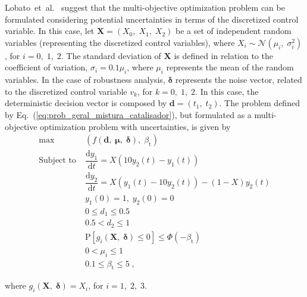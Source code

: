 \documentclass[final,5p,times,twocolumn,numbers]{elsarticle}
\newcommand{\vect}[1]{\mathbf{\boldsymbol{#1}}}
\begin{document}
Lobato~et~al.~\cite{bib:lobato2019} suggest that the multi-objective optimization problem can be formulated considering potential uncertainties in terms of the discretized control variable. In this case, let $ \mathbf{X} = \left( X_{0}, \; X_{1}, \; X_{2} \right) $ be a set of independent random variables (representing the discretized control variables), where $ X_{i} \sim \mathcal{N} \left( \mu_{i}, \; \sigma_{i}^{2} \right) $, for $ i = 0, \; 1, \; 2 $. The standard deviation of $ \mathbf{X} $ is defined in relation to the coefficient of variation, $ \sigma_{i} = 0.1 \mu_{i} $, where $ \mu_{i} $ represents the mean of the random variables. In the case of robustness analysis, $ \vect{\delta} $ represents the noise vector, related to the discretized control variable $ v_{k} $, for $ k = 0, \; 1, \; 2 $. In this case, the deterministic decision vector is composed by $ \mathbf{d} = \left( t_{1}, \; t_{2} \right) $. The problem defined by Eq.~(\ref{eq:prob_geral_mistura_catalisador}), but formulated as a multi-objective optimization problem with uncertainties, is given by
%
\begin{equation} \label{eq:prob_mistura catalisador_incertezas}
\begin{split}
\max \; &\left( f \left( \mathbf{d}, \; \vect{\mu}, \; \vect{\delta} \right), \; \beta_{\mathrm{t}} \right)\\
\textrm{Subject to} \; &\dfrac{\mathrm{d} y_{1}}{\mathrm{d} t} = X \left( 10 y_{2} \left( t \right) - y_{1} \left( t \right) \right)\\
\phantom{Subject to} \; &\dfrac{\mathrm{d} y_{2}}{\mathrm{d} t} = X \left( y_{1} \left( t \right) - 10 y_{2} \left( t \right) \right) - \left( 1 - X \right) y_{2} \left( t \right)\\
\phantom{Subject to} \; &y_{1} \left( 0 \right) = 1, \; y_{2} \left( 0 \right) = 0\\
\phantom{Subject to} \; &0 \leq d_{1} \leq 0.5\\
\phantom{Subject to} \; &0.5 < d_{2} \leq 1\\
\phantom{Subject to} \; &\mathrm{P} \left[ g_{i} \left( \mathbf{X}, \; \vect{\delta} \right) \leq 0 \right] \leq \Phi \left( -\beta_{\mathrm{t}} \right)\\
\phantom{Subject to} \; &0 < \mu_{i} \leq 1\\
\phantom{Subject to} \; &0.1 \leq \beta_{\mathrm{t}} \leq 5 \; ,
\end{split}
\end{equation}

\noindent where $ g_{i} \left( \mathbf{X}, \; \vect{\delta} \right) = X_{i} $, for $ i = 1, \; 2, \; 3 $.
\end{document}
